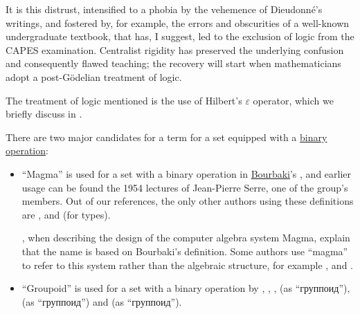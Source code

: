 \begin{remark}
\begin{displayquote}
    It is this distrust, intensified to a phobia by the vehemence of Dieudonn\'e's writings, and fostered by, for example, the errors and obscurities of a well-known undergraduate textbook, that has, I suggest, led to the exclusion of logic from the CAPES examination. Centralist rigidity has preserved the underlying confusion and consequently flawed teaching; the recovery will start when mathematicians adopt a post-G\"odelian treatment of logic.
  \end{displayquote}

  The treatment of logic mentioned is the use of Hilbert's \( \varepsilon \) operator, which we briefly discuss in .
\end{remark}

\begin{remark}\label{rem:magma_terminology}
  There are two major candidates for a term for a set equipped with a \hyperref[def:binary_operation]{binary operation}:
  \begin{itemize}
    \item \enquote{Magma} is used for a set with a binary operation in \hyperref[rem:bourbaki]{Bourbaki}'s \cite[def. A I.1]{Bourbaki1970Algèbre1à3}, and earlier usage can be found the 1954 lectures \cite[18]{Serre1992LieGroups} of Jean-Pierre Serre, one of the group's members. Out of our references, the only other authors using these definitions are ,  and  (for types).

    , when describing the design of the computer algebra system Magma, explain that the name is based on Bourbaki's definition. Some authors use \enquote{magma} to refer to this system rather than the algebraic structure, for example ,  and .

    \item \enquote{Groupoid} is used for a set with a binary operation by
    ,
    ,
    ,
     (as \enquote{группоид}),
     (as \enquote{группоид}) and
     (as \enquote{группоид}).


\end{itemize}
\end{remark}
